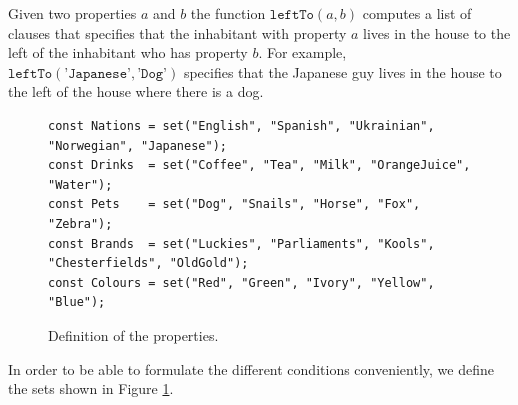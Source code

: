 Given two properties $a$ and $b$ the function $\texttt{leftTo}(a, b)$ computes a
list of clauses that specifies that the inhabitant with property $a$ lives in
the house to the left of the inhabitant who has property $b$.  For example,
$\texttt{leftTo}(\texttt{'Japanese'}, \texttt{'Dog'})$ specifies that the
Japanese guy lives in the house to the left of the house where there is a dog.

\begin{figure}[!ht]
\centering
\begin{verbatim}
const Nations = set("English", "Spanish", "Ukrainian", "Norwegian", "Japanese");
const Drinks  = set("Coffee", "Tea", "Milk", "OrangeJuice", "Water");
const Pets    = set("Dog", "Snails", "Horse", "Fox", "Zebra");
const Brands  = set("Luckies", "Parliaments", "Kools", "Chesterfields", "OldGold");
const Colours = set("Red", "Green", "Ivory", "Yellow", "Blue");
\end{verbatim}
\vspace*{-0.3cm}
\caption{Definition of the properties.}
\label{fig:properties}
\end{figure}

In order to be able to formulate the different conditions conveniently, we define the sets
shown in Figure \ref{fig:properties}.

